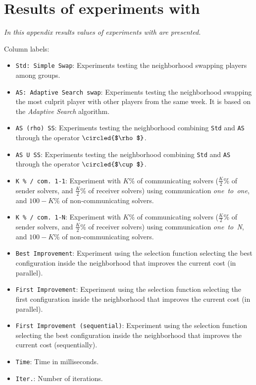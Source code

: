 \chapter{Results of experiments with \sgp}
\label{app:sgp}
\textit{In this appendix results values of experiments with \sgp{} are presented. }
\vfill
\newpage

Column labels:
\begin{itemize}
\item \texttt{Std: Simple Swap}: Experiments testing the neighborhood \cm{} swapping players among groups.
\item \texttt{AS: Adaptive Search swap}: Experiments testing the neighborhood \cm{} swapping the most culprit player with other players from the same week. It is based on the {\it Adaptive Search} algorithm.
\item \texttt{AS (rho) SS}: Experiments testing the neighborhood \cm{} combining \texttt{Std} and \texttt{AS} through the operator $\circled{$\rho$}$.
\item \texttt{AS U SS}: Experiments testing the neighborhood \cm{} combining \texttt{Std} and \texttt{AS} through the operator $\circled{$\cup$}$.
\item \texttt{K \% / com. 1-1}: Experiment with $K$\% of communicating solvers ($\tfrac{K}{2}$\% of sender solvers, and $\tfrac{K}{2}$\% of receiver solvers) using communication \textit{one~to~one}, and $100-K$\% of non-communicating solvers.
\item \texttt{K \% / com. 1-N}: Experiment with $K$\% of communicating solvers ($\tfrac{K}{2}$\% of sender solvers, and $\tfrac{K}{2}$\% of receiver solvers) using communication \textit{one~to~N}, and $100-K$\% of non-communicating solvers.
\item \texttt{Best Improvement}: Experiment using the selection function selecting the best configuration inside the neighborhood that improves the current cost (in parallel).
\item \texttt{First Improvement}: Experiment using the selection function selecting the first configuration inside the neighborhood that improves the current cost (in parallel).
\item \texttt{First Improvement (sequential)}: Experiment using the selection function selecting the best configuration inside the neighborhood that improves the current cost (sequentially).
\item \texttt{Time}: Time in milliseconds. 
\item \texttt{Iter.}: Number of iterations.
\end{itemize}

